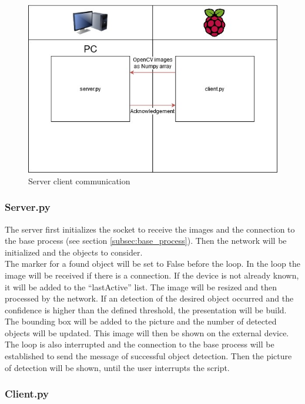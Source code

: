 \begin{figure}[H]
\centering
\includegraphics[scale=0.8]{sources/client_server.jpg}
\caption[Server client communication]{Server client communication}
\label{fig:depthwise_convolution}
\end{figure}

\subsubsection{Server.py}

The server first initializes the socket to receive the images and the connection to the base process (see section \ref{subsec:base_process}). Then the network will be initialized and the objects to consider.\\

The marker for a found object will be set to False before the loop. In the loop the image will be received if there is a connection. If the device is not already known, it will be added to the ``lastActive'' list. The image will be resized and then processed by the network.  If an detection of the desired object occurred and the confidence is higher than the defined threshold, the presentation will be build. The bounding box will be added to the picture and the number of detected objects will be updated. This image will then be shown on the external device. The loop is also interrupted and the connection to the base process will be established to send the message of successful object detection. Then the picture of detection will be shown, until the user interrupts the script.

\subsubsection{Client.py}


